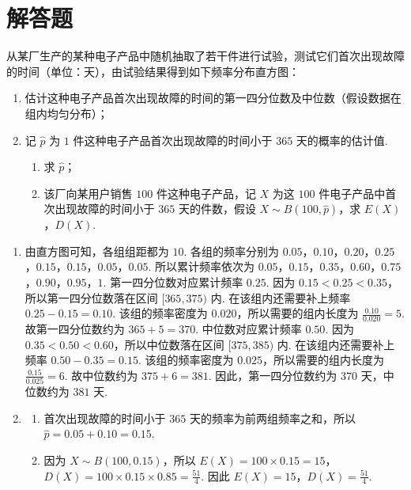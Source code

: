 \documentclass[UTF8,a4paper,oneside,11pt]{ctexbook}
\begin{document}
\section{解答题}

\begin{problem}
从某厂生产的某种电子产品中随机抽取了若干件进行试验，测试它们首次出现故障的时间（单位：天），由试验结果得到如下频率分布直方图：

\begin{enumerate}
\item 估计这种电子产品首次出现故障的时间的第一四分位数及中位数（假设数据在组内均匀分布）；
\item 记 \(\hat{p}\) 为 \(1\) 件这种电子产品首次出现故障的时间小于 \(365\) 天的概率的估计值.
    \begin{enumerate}
    \item 求 \(\hat{p}\)；
    \item 该厂向某用户销售 \(100\) 件这种电子产品，记 \(X\) 为这 \(100\) 件电子产品中首次出现故障的时间小于 \(365\) 天的件数，假设 \(X\sim B\left( 100,\hat{p} \right)\)，求 \(E\left( X \right)\)，\(D\left( X \right)\).
    \end{enumerate}
\end{enumerate}

\end{problem}

\begin{solution}
\begin{enumerate}
\item 由直方图可知，各组组距都为 \(10\). 各组的频率分别为 \(0.05\)，\(0.10\)，\(0.20\)，\(0.25\)，\(0.15\)，\(0.15\)，\(0.05\)，\(0.05\).
所以累计频率依次为 \(0.05\)，\(0.15\)，\(0.35\)，\(0.60\)，\(0.75\)，\(0.90\)，\(0.95\)，\(1\).
第一四分位数对应累计频率 \(0.25\). 因为 \(0.15<0.25<0.35\)，所以第一四分位数落在区间 \([365,375)\) 内. 在该组内还需要补上频率 \(0.25-0.15=0.10\). 该组的频率密度为 \(0.020\)，所以需要的组内长度为 \(\frac{0.10}{0.020}=5\). 故第一四分位数约为 \(365+5=370\).
中位数对应累计频率 \(0.50\). 因为 \(0.35<0.50<0.60\)，所以中位数落在区间 \([375,385)\) 内. 在该组内还需要补上频率 \(0.50-0.35=0.15\). 该组的频率密度为 \(0.025\)，所以需要的组内长度为 \(\frac{0.15}{0.025}=6\). 故中位数约为 \(375+6=381\).
因此，第一四分位数约为 \(370\) 天，中位数约为 \(381\) 天.

\item
    \begin{enumerate}
    \item 首次出现故障的时间小于 \(365\) 天的频率为前两组频率之和，所以 \(\hat{p}=0.05+0.10=0.15\).

    \item 因为 \(X\sim B\left( 100,0.15 \right)\)，所以 \(E(X)=100\times 0.15=15\)，\(D(X)=100\times 0.15\times 0.85=\frac{51}{4}\). 因此 \(E(X)=15\)，\(D(X)=\frac{51}{4}\).
    \end{enumerate}
\end{enumerate}
\end{solution}
\end{document}
